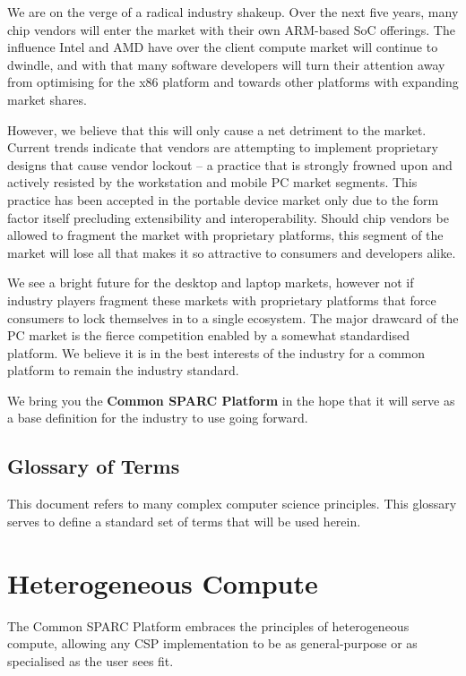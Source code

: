 \documentclass[12pt]{report}
\begin{document}
We are on the verge of a radical industry shakeup. Over the next five years, many chip vendors will enter the market
with their own ARM-based SoC offerings. The influence Intel and AMD have over the client compute market will continue to
dwindle, and with that many software developers will turn their attention away from optimising for the x86 platform and
towards other platforms with expanding market shares.

However, we believe that this will only cause a net detriment to the market. Current trends indicate that vendors are
attempting to implement proprietary designs that cause vendor lockout -- a practice that is strongly frowned upon and
actively resisted by the workstation and mobile PC market segments. This practice has been accepted in the portable device
market only due to the form factor itself precluding extensibility and interoperability. Should chip vendors be allowed
to fragment the market with proprietary platforms, this segment of the market will lose all that makes it so attractive
to consumers and developers alike.

We see a bright future for the desktop and laptop markets, however not if industry players fragment these markets with
proprietary platforms that force consumers to lock themselves in to a single ecosystem. The major drawcard of the PC
market is the fierce competition enabled by a somewhat standardised platform. We believe it is in the best interests
of the industry for a common platform to remain the industry standard.

We bring you the \textbf{Common SPARC Platform} in the hope that it will serve as a base definition for the industry to
use going forward. 

\section{Glossary of Terms}
This document refers to many complex computer science principles. This glossary serves to define a standard set of terms
that will be used herein.

\tableofcontents
\newpage

\chapter{Heterogeneous Compute}
\large{The Common SPARC Platform embraces the principles of heterogeneous compute, allowing any CSP implementation to be
as general-purpose or as specialised as the user sees fit.}
\end{document}
